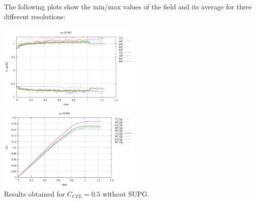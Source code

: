 The following plots show the min/max values of the field and its average for three
different resolutions:
\begin{center}
\includegraphics[width=7cm]{python_codes/fieldstone_43/results/experiment9/stats_T.pdf}
\includegraphics[width=7cm]{python_codes/fieldstone_43/results/experiment9/avrg_T.pdf}\\
{\captionfont Results obtained for $C_{CFL}=0.5$ without SUPG.}
\end{center}

